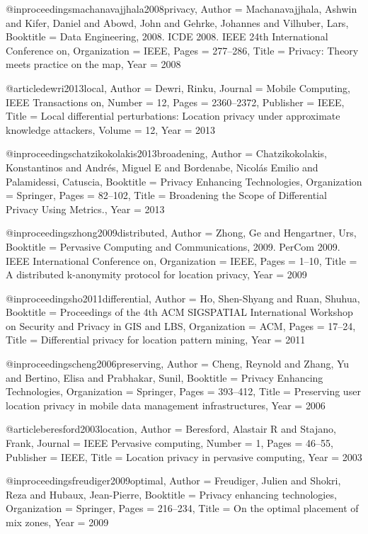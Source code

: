{{{{{{{	@inproceedings{machanavajjhala2008privacy,
	Author = {Machanavajjhala, Ashwin and Kifer, Daniel and Abowd, John and Gehrke, Johannes and Vilhuber, Lars},
	Booktitle = {Data Engineering, 2008. ICDE 2008. IEEE 24th International Conference on},
	Organization = {IEEE},
	Pages = {277--286},
	Title = {Privacy: Theory meets practice on the map},
	Year = {2008}}
	
	@article{dewri2013local,
	Author = {Dewri, Rinku},
	Journal = {Mobile Computing, IEEE Transactions on},
	Number = {12},
	Pages = {2360--2372},
	Publisher = {IEEE},
	Title = {Local differential perturbations: Location privacy under approximate knowledge attackers},
	Volume = {12},
	Year = {2013}}
	
	@inproceedings{chatzikokolakis2013broadening,
	Author = {Chatzikokolakis, Konstantinos and Andr{\'e}s, Miguel E and Bordenabe, Nicol{\'a}s Emilio and Palamidessi, Catuscia},
	Booktitle = {Privacy Enhancing Technologies},
	Organization = {Springer},
	Pages = {82--102},
	Title = {Broadening the Scope of Differential Privacy Using Metrics.},
	Year = {2013}}
	
	@inproceedings{zhong2009distributed,
	Author = {Zhong, Ge and Hengartner, Urs},
	Booktitle = {Pervasive Computing and Communications, 2009. PerCom 2009. IEEE International Conference on},
	Organization = {IEEE},
	Pages = {1--10},
	Title = {A distributed k-anonymity protocol for location privacy},
	Year = {2009}}
	
	@inproceedings{ho2011differential,
	Author = {Ho, Shen-Shyang and Ruan, Shuhua},
	Booktitle = {Proceedings of the 4th ACM SIGSPATIAL International Workshop on Security and Privacy in GIS and LBS},
	Organization = {ACM},
	Pages = {17--24},
	Title = {Differential privacy for location pattern mining},
	Year = {2011}}
	
	@inproceedings{cheng2006preserving,
	Author = {Cheng, Reynold and Zhang, Yu and Bertino, Elisa and Prabhakar, Sunil},
	Booktitle = {Privacy Enhancing Technologies},
	Organization = {Springer},
	Pages = {393--412},
	Title = {Preserving user location privacy in mobile data management infrastructures},
	Year = {2006}}
	
	@article{beresford2003location,
	Author = {Beresford, Alastair R and Stajano, Frank},
	Journal = {IEEE Pervasive computing},
	Number = {1},
	Pages = {46--55},
	Publisher = {IEEE},
	Title = {Location privacy in pervasive computing},
	Year = {2003}}
	
	@inproceedings{freudiger2009optimal,
	Author = {Freudiger, Julien and Shokri, Reza and Hubaux, Jean-Pierre},
	Booktitle = {Privacy enhancing technologies},
	Organization = {Springer},
	Pages = {216--234},
	Title = {On the optimal placement of mix zones},
	Year = {2009}}
	
}}}}}}}
